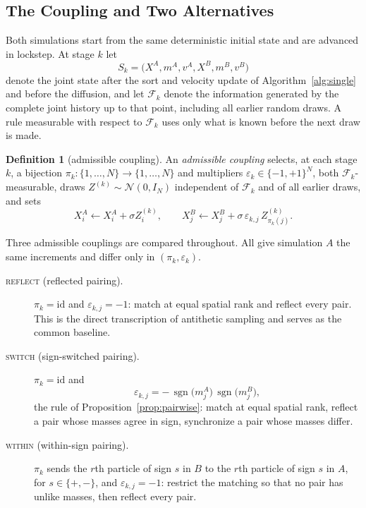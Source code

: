 \documentclass[smallextended,nospthms]{svjour3}
\theoremstyle{plain}
\theoremstyle{definition}
\newtheorem{definition}[proposition]{Definition}
\theoremstyle{remark}
\numberwithin{equation}{section}
\newcommand{\sgn}{\operatorname{sgn}}
\newcommand{\Fil}{\mathcal{F}}
\newcommand{\refl}{\textnormal{\textsc{reflect}}}
\newcommand{\swi}{\textnormal{\textsc{switch}}}
\newcommand{\wit}{\textnormal{\textsc{within}}}
\begin{document}
\subsection{The Coupling and Two Alternatives}
\label{sec:rules}

Both simulations start from the same deterministic initial state and are
advanced in lockstep. At stage $k$ let
\[
  S_k=\bigl(X^A,m^A,v^A,X^B,m^B,v^B\bigr)
\]
denote the joint state after the sort and velocity update of
Algorithm~\ref{alg:single} and before the diffusion, and let $\Fil_k$ denote
the information generated by the complete joint history up to that point,
including all earlier random draws. A rule measurable with respect to $\Fil_k$
uses only what is known before the next draw is made.

\begin{definition}[admissible coupling]
\label{def:coupling}
An \emph{admissible coupling} selects, at each stage $k$, a bijection
$\pi_k:\{1,\dots,N\}\to\{1,\dots,N\}$ and multipliers
$\varepsilon_k\in\{-1,+1\}^N$, both $\Fil_k$-measurable, draws
$Z^{(k)}\sim\mathcal N(0,I_N)$ independent of $\Fil_k$ and of all earlier
draws, and sets
\begin{equation}
  X^A_i \leftarrow X^A_i+\sigma Z^{(k)}_i,
  \qquad
  X^B_j \leftarrow X^B_j+\sigma\,\varepsilon_{k,j}\,Z^{(k)}_{\pi_k(j)} .
  \label{eq:coupling}
\end{equation}
\end{definition}

Three admissible couplings are compared throughout. All give simulation $A$ the
same increments and differ only in $(\pi_k,\varepsilon_k)$.

\begin{description}
\item[\refl{} (reflected pairing).] $\pi_k=\mathrm{id}$ and
  $\varepsilon_{k,j}=-1$: match at equal spatial rank and reflect every pair.
  This is the direct transcription of antithetic sampling and serves as the
  common baseline.
\item[\swi{} (sign-switched pairing).] $\pi_k=\mathrm{id}$ and
  \begin{equation}
    \varepsilon_{k,j}=-\,\sgn\!\bigl(m^A_j\bigr)\,\sgn\!\bigl(m^B_j\bigr),
    \label{eq:switch}
  \end{equation}
  the rule of Proposition~\ref{prop:pairwise}: match at equal spatial rank,
  reflect a pair whose masses agree in sign, synchronize a pair whose masses
  differ.
\item[\wit{} (within-sign pairing).] $\pi_k$ sends the $r$th particle of sign
  $s$ in $B$ to the $r$th particle of sign $s$ in $A$, for $s\in\{+,-\}$, and
  $\varepsilon_{k,j}=-1$: restrict the matching so that no pair has unlike
  masses, then reflect every pair.
\end{description}
\end{document}
